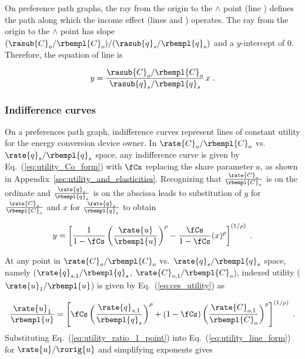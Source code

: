 On preference path graphs, 
the ray from the origin to the $\wedge$ point 
(line \rr{})
defines the path along which the income effect
(lines \hatd{} and \dbar{})
operates.
The ray from the origin to the $\wedge$ point
has slope $(\rasub{C}_o/\rbempl{C}_o) / (\rasub{q}_s/\rbempl{q}_s)$
and a $y$-intercept of 0.
Therefore, the equation of line \rr{} is

\begin{equation} \label{eq:ray_prefs}
  y = \frac{\rasub{C}_o/\rbempl{C}_o}{\rasub{q}_s/\rbempl{q}_s} \, x \; .
\end{equation}


\subsubsection{Indifference curves} 
\label{sec:pref_graph_indifference_curves}

On a preferences path graph, 
indifference curves represent lines of constant utility
for the energy conversion device owner.
In $\rate{C}_o/\rbempl{C}_o$ vs.\ $\rate{q}_s/\rbempl{q}_s$ space, 
any indifference curve 
is given by 
Eq.~(\ref{eq:utility_Co_form})
with $\fCs$ replacing the share parameter $a$, 
as shown in Appendix~\ref{sec:utility_and_elasticities}.
Recognizing that 
$\frac{\rate{C}_o}{\rbempl{C}_o}$ is on the ordinate and 
$\frac{\rate{q}_s}{\rbempl{q}_s}$ is on the abscissa
leads to substitution of 
$y$ for $\frac{\rate{C}_o}{\rbempl{C}_o}$ and 
$x$ for $\frac{\rate{q}_s}{\rbempl{q}_s}$ to obtain

\begin{equation} \label{eq:utility_line_form}
  y = \left[ \frac{1}{1 - \fCs} \left( \frac{\rate{u}}{\rbempl{u}} \right)^\rho 
            - \frac{\fCs}{1 - \fCs} (x)^\rho \right]^{(1/\rho)} \; .
\end{equation}

At any point in 
$\rate{C}_o/\rbempl{C}_o$ vs.\ $\rate{q}_s/\rbempl{q}_s$ space,
namely ($\rate{q}_{s,1}/\rbempl{q}_s$, $\rate{C}_{o,1}/\rbempl{C}_o$),
indexed utility ($\rate{u}_1/\rbempl{u}$) is given by Eq.~(\ref{eq:ces_utility}) as

\begin{equation} \label{eq:utility_ratio_1_point}
  \frac{\rate{u}_1}{\rbempl{u}} =
        \left[ \fCs \left( \frac{\rate{q}_{s,1}}{\rbempl{q}_s} \right)^\rho
        + (1-\fCs) \left( \frac{\rate{C}_{o,1}}{\rbempl{C}_o} \right)^\rho  \right]^{(1/\rho)} \; .
\end{equation}
%
Substituting Eq.~(\ref{eq:utility_ratio_1_point}) into Eq.~(\ref{eq:utility_line_form})
for $\rate{u}/\rorig{u}$
and simplifying exponents gives

